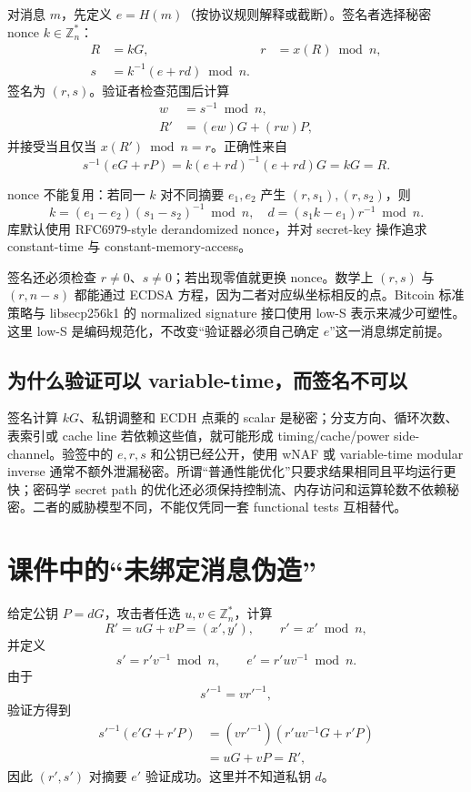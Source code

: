 \documentclass[11pt,a4paper,fontset=none]{ctexart}
\begin{document}
对消息 $m$，先定义 $e=H(m)$（按协议规则解释或截断）。签名者选择秘密 nonce $k\in\mathbb{Z}_n^*$：
\begin{align*}
R&=kG, & r&=x(R)\bmod n,\\
s&=k^{-1}(e+rd)\bmod n.
\end{align*}
签名为 $(r,s)$。验证者检查范围后计算
\begin{align*}
w&=s^{-1}\bmod n,\\
R'&=(ew)G+(rw)P,
\end{align*}
并接受当且仅当 $x(R')\bmod n=r$。正确性来自
\[
s^{-1}(eG+rP)
=k(e+rd)^{-1}(e+rd)G
=kG=R.
\]

nonce 不能复用：若同一 $k$ 对不同摘要 $e_1,e_2$ 产生 $(r,s_1),(r,s_2)$，则
\[
k=(e_1-e_2)(s_1-s_2)^{-1}\bmod n,
\quad d=(s_1k-e_1)r^{-1}\bmod n.
\]
库默认使用 RFC6979-style derandomized nonce，并对 secret-key 操作追求 constant-time 与 constant-memory-access。

签名还必须检查 $r\ne0$、$s\ne0$；若出现零值就更换 nonce。数学上 $(r,s)$ 与 $(r,n-s)$ 都能通过 ECDSA 方程，因为二者对应纵坐标相反的点。Bitcoin 标准策略与 libsecp256k1 的 normalized signature 接口使用 low-S 表示来减少可塑性。这里 low-S 是编码规范化，不改变“验证器必须自己确定 $e$”这一消息绑定前提。

\subsection{为什么验证可以 variable-time，而签名不可以}

签名计算 $kG$、私钥调整和 ECDH 点乘的 scalar 是秘密；分支方向、循环次数、表索引或 cache line 若依赖这些值，就可能形成 timing/cache/power side-channel。验签中的 $e,r,s$ 和公钥已经公开，使用 wNAF 或 variable-time modular inverse 通常不额外泄漏秘密。所谓“普通性能优化”只要求结果相同且平均运行更快；密码学 secret path 的优化还必须保持控制流、内存访问和运算轮数不依赖秘密。二者的威胁模型不同，不能仅凭同一套 functional tests 互相替代。

\section{课件中的“未绑定消息伪造”}

给定公钥 $P=dG$，攻击者任选 $u,v\in\mathbb{Z}_n^*$，计算
\[
R'=uG+vP=(x',y'),\qquad r'=x'\bmod n,
\]
并定义
\[
s'=r'v^{-1}\bmod n,
\qquad e'=r'uv^{-1}\bmod n.
\]
由于
\[
s'^{-1}=vr'^{-1},
\]
验证方得到
\begin{align*}
s'^{-1}(e'G+r'P)
&=(vr'^{-1})(r'uv^{-1}G+r'P)\\
&=uG+vP=R',
\end{align*}
因此 $(r',s')$ 对摘要 $e'$ 验证成功。这里并不知道私钥 $d$。
\end{document}
